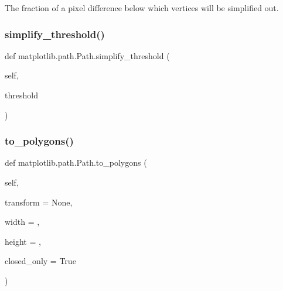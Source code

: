 \begin{DoxyVerb}The fraction of a pixel difference below which vertices will
be simplified out.
\end{DoxyVerb}
 \mbox{\label{classmatplotlib_1_1path_1_1Path_aaf9de7febc75199ff89ebec8a0e295d6}} 
\subsubsection{\texorpdfstring{simplify\+\_\+threshold()}{simplify\_threshold()}\hspace{0.1cm}{\footnotesize\ttfamily [2/2]}}
{\footnotesize\ttfamily def matplotlib.\+path.\+Path.\+simplify\+\_\+threshold (\begin{DoxyParamCaption}\item[{}]{self,  }\item[{}]{threshold }\end{DoxyParamCaption})}

\mbox{\label{classmatplotlib_1_1path_1_1Path_a8bc3f213058dc56411ad019efbe74acb}} 
\subsubsection{\texorpdfstring{to\+\_\+polygons()}{to\_polygons()}}
{\footnotesize\ttfamily def matplotlib.\+path.\+Path.\+to\+\_\+polygons (\begin{DoxyParamCaption}\item[{}]{self,  }\item[{}]{transform = {\ttfamily None},  }\item[{}]{width = {},  }\item[{}]{height = {},  }\item[{}]{closed\+\_\+only = {\ttfamily True} }\end{DoxyParamCaption})}


